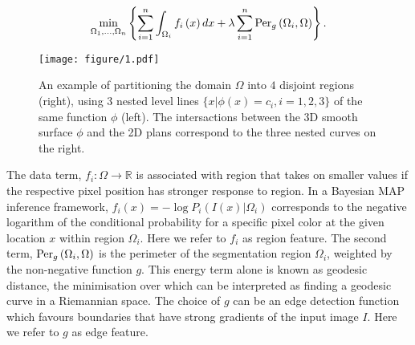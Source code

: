 \documentclass[runningheads,a4paper]{llncs}
\begin{document}
\begin{equation} \label{eq:MP}
\mathop {\min }\limits_{{\Omega _1},...,{\Omega _n}} \left\{ {\sum\limits_{i = 1}^n {\int_{{\Omega _i}} {{f_i}\left( x \right)dx} }  + \lambda \sum\limits_{i = 1}^n {{\rm{Pe}}{{\rm{r}}_g}\left( {{\Omega _i},\Omega } \right)} } \right\}.
\end{equation}\begin{wrapfigure}{ro}{0.4\textwidth}
\vspace{-30pt}
\centering
\texttt{[image: figure/1.pdf]}
\vspace{-15pt}
\caption{An example of partitioning the domain $\Omega$ into $4$ disjoint regions (right), using $3$ nested level lines $\{x|\phi(x)= c_i , i=1,2,3\} $ of the same function $\phi$ (left). The intersactions between the 3D smooth surface $\phi$ and the 2D plans correspond to the three nested curves on the right.}
\vspace{-22pt}
\label{fig:nestedLS}
\end{wrapfigure}\noindent The data term, $f_i:\Omega \to \mathbb{R}$ is associated with region that takes on smaller values if the respective pixel position has stronger response to region. In a Bayesian MAP inference framework, ${f_i}\left( x \right) =  - \log P_i \left( {I\left( x \right)|{\Omega _i}} \right)$ corresponds to the negative logarithm of the conditional probability for a specific pixel color at the given location $x$ within region $\Omega_i$. Here we refer to $f_i$ as region feature. The second term, ${{\rm{Pe}}{{\rm{r}}_g}\left( {{\Omega _i},\Omega } \right)}$ is the perimeter of the segmentation region $\Omega_i$, weighted by the non-negative function $g$. This energy term alone is known as geodesic distance, the minimisation over which can be interpreted as finding a geodesic curve in a Riemannian space. The choice of $g$ can be an edge detection function which favours boundaries that have strong gradients of the input image $I$. Here we refer to $g$ as edge feature. 
\end{document}
